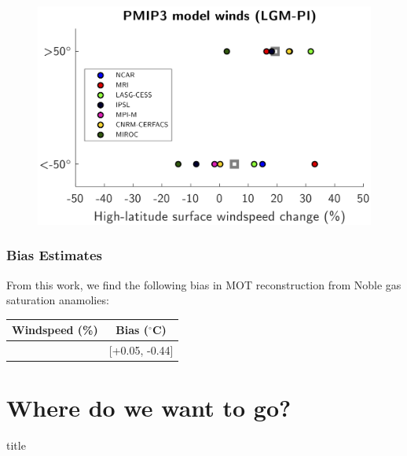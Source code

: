 \documentclass{beamer}
\begin{document}
\begin{frame}
	\begin{figure}
        	\centering
		\vfill
        	\includegraphics[width=\textwidth]{images/4}
        	\label{fig:4}
        	\vfill
    	\end{figure}    
\end{frame}

\begin{frame}
\frametitle{Bias Estimates}
From this work, we find the following bias in MOT reconstruction from Noble gas saturation anamolies:
\begin{table}
	\centering
	\begin{tabular}{c|c}
		\textbf{Windspeed (\%)} & \textbf{Bias ($^\circ$C)} \\
		\hline
		[0, +30] & [+0.05, -0.44] \\
	\end{tabular}
\end{table}
\end{frame}

\section{Where do we want to go?} 

\begin{frame}
    \vfill
    \centering
    \begin{beamercolorbox}[sep=8pt,center,shadow=false,rounded=false]{title}
        \insertsectionhead
        \par
    \end{beamercolorbox}
    \vfill
\end{frame}
\end{document}
